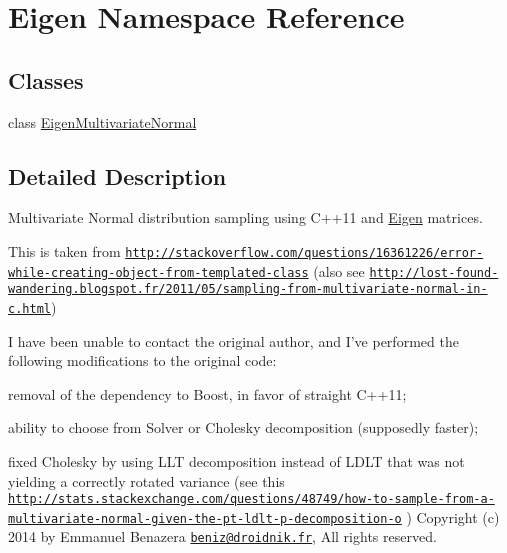\hypertarget{namespaceEigen}{\section{Eigen Namespace Reference}
\label{namespaceEigen}
}
\subsection*{Classes}
\begin{DoxyCompactItemize}
\item 
class \hyperlink{classEigen_1_1EigenMultivariateNormal}{Eigen\-Multivariate\-Normal}
\end{DoxyCompactItemize}


\subsection{Detailed Description}
Multivariate Normal distribution sampling using C++11 and \hyperlink{namespaceEigen}{Eigen} matrices.

This is taken from \href{http://stackoverflow.com/questions/16361226/error-while-creating-object-from-templated-class}{\tt http\-://stackoverflow.\-com/questions/16361226/error-\/while-\/creating-\/object-\/from-\/templated-\/class} (also see \href{http://lost-found-wandering.blogspot.fr/2011/05/sampling-from-multivariate-normal-in-c.html}{\tt http\-://lost-\/found-\/wandering.\-blogspot.\-fr/2011/05/sampling-\/from-\/multivariate-\/normal-\/in-\/c.\-html})

I have been unable to contact the original author, and I've performed the following modifications to the original code\-:
\begin{DoxyItemize}
\item removal of the dependency to Boost, in favor of straight C++11;
\item ability to choose from Solver or Cholesky decomposition (supposedly faster);
\item fixed Cholesky by using L\-L\-T decomposition instead of L\-D\-L\-T that was not yielding a correctly rotated variance (see this \href{http://stats.stackexchange.com/questions/48749/how-to-sample-from-a-multivariate-normal-given-the-pt-ldlt-p-decomposition-o}{\tt http\-://stats.\-stackexchange.\-com/questions/48749/how-\/to-\/sample-\/from-\/a-\/multivariate-\/normal-\/given-\/the-\/pt-\/ldlt-\/p-\/decomposition-\/o} ) Copyright (c) 2014 by Emmanuel Benazera \href{mailto:beniz@droidnik.fr}{\tt beniz@droidnik.\-fr}, All rights reserved.
\end{DoxyItemize}

